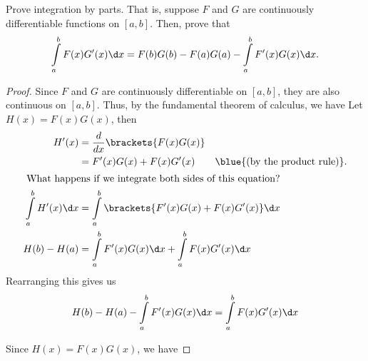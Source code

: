 \begin{problem}
  Prove integration by parts.
  That is, suppose $F$ and $G$ are continuously differentiable functions on $[a, b]$.
  Then, prove that
  \[
    \int\limits_a^b F(x)G'(x) \d x = F(b)G(b) - F(a)G(a) - \int\limits_a^b F'(x)G(x) \d x.
  \]
\end{problem}

  \begin{proof}
    Since $F$ and $G$ are continuously differentiable on $[a, b]$,
    they are also continuous on $[a, b]$.
    Thus, by the fundamental theorem of calculus, we have
    Let $H(x) = F(x)G(x)$, then
    \begin{align*}
      H'(x) &= \frac{d}{dx} \brackets{F(x)G(x)} \\
            &= F'(x)G(x) + F(x)G'(x) \qquad \blue{\text{(by the product rule)}}. \\
      \intertext{ What happens if we integrate both sides of this equation? }
      \int\limits_a^b H'(x) \d x &= \int\limits_a^b \brackets{F'(x)G(x) + F(x)G'(x)} \d x \\
      H(b) - H(a) &= \int\limits_a^b F'(x)G(x) \d x + \int\limits_a^b F(x)G'(x) \d x
    \end{align*}
    Rearranging this gives us
    \[
      H(b) - H(a) - \int\limits_a^b F'(x)G(x) \d x = \int\limits_a^b F(x)G'(x) \d x
    \]

    Since $H(x) = F(x)G(x)$, we have
    \blue{\[
      \int\limits_a^b F(x)G'(x) \d x = F(b)G(b) - F(a)G(a) - \int\limits_a^b F'(x)G(x) \d x
    \]}
  \end{proof}
